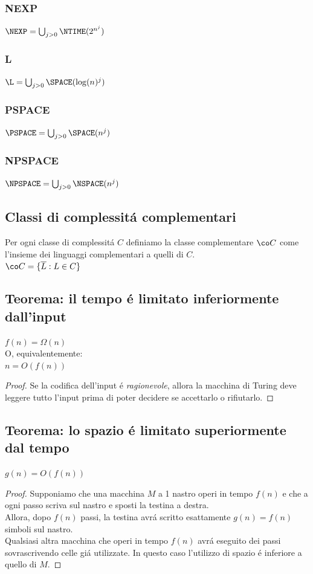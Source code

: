 \subsubsection{NEXP}
$\NEXP = \bigcup_{j>0} \NTIME(2^{n^j})$
\subsubsection{L}
$\L = \bigcup_{j>0} \SPACE(\log(n)^j)$
\subsubsection{PSPACE}
$\PSPACE = \bigcup_{j>0} \SPACE(n^j)$
\subsubsection{NPSPACE}
$\NPSPACE = \bigcup_{j>0} \NSPACE(n^j)$

\subsection{Classi di complessitá complementari}
Per ogni classe di complessitá $C$ definiamo la classe complementare $\co C$ come l'insieme dei linguaggi complementari a quelli di $C$. \\
$\co C = \{ \overline{L} : L \in C \}$


\subsection{Teorema: il tempo é limitato inferiormente dall'input}
\label{teorema:tempo_limitato_inferiormente_dall_input}
{$f(n) = \Omega(n)$} \\
O, equivalentemente: \\
{$n = O(f(n))$}
\begin{proof}
Se la codifica dell'input é \textit{ragionevole}, allora la macchina di Turing deve leggere tutto l'input prima di poter decidere se accettarlo o rifiutarlo.
\end{proof}


\subsection{Teorema: lo spazio é limitato superiormente dal tempo}
\label{teorema:spazio_limitato_superiormente_dal_tempo}
{$g(n) = O(f(n))$}
\begin{proof}
Supponiamo che una macchina $M$ a 1 nastro operi in tempo $f(n)$ e che a ogni passo scriva sul nastro e sposti la testina a destra. \\
Allora, dopo $f(n)$ passi, la testina avrá scritto esattamente $g(n) = f(n)$ simboli sul nastro. \\
Qualsiasi altra macchina che operi in tempo $f(n)$ avrá eseguito dei passi sovrascrivendo celle giá utilizzate. In questo caso l'utilizzo di spazio é inferiore a quello di $M$.
\end{proof}

